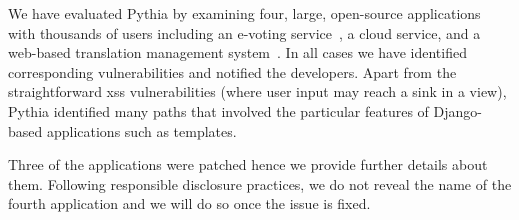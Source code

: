 We have evaluated Pythia by
examining four,
large,
open-source applications
with thousands of users including
an e-voting service~\cite{zeus-jets},
a cloud service,
and a web-based translation
management system~\cite{weblate}.
In all cases we have identified
corresponding vulnerabilities and
notified the developers.
Apart from the straightforward
{\sc xss} vulnerabilities
(where user input may reach a
sink in a view),
Pythia identified many paths
that involved the particular features of
Django-based applications such as templates.

Three of the applications were patched
hence we provide further details about them.
Following responsible disclosure practices,
we do not reveal the name of
the fourth application and we will
do so once the issue is fixed.




